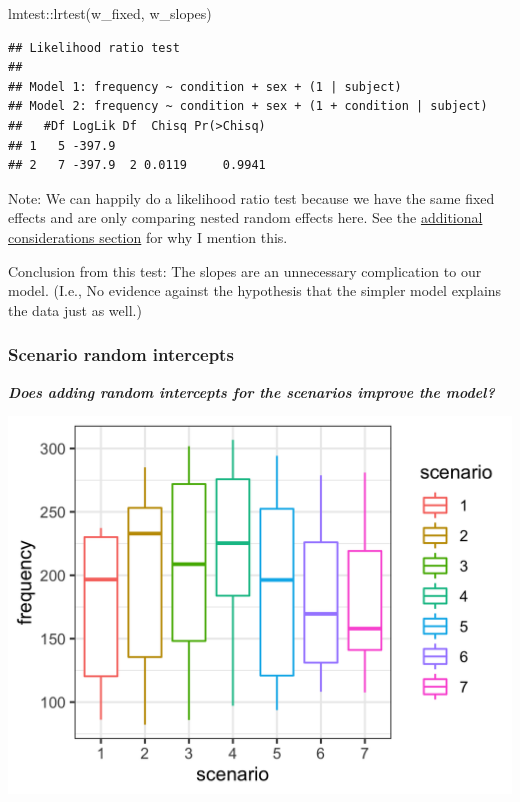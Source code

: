 \documentclass[
  openany]{book}
\newenvironment{Shaded}{\begin{snugshade}}{\end{snugshade}}
\newcommand{\FunctionTok}[1]{\textcolor[rgb]{0.00,0.00,0.00}{#1}}
\newcommand{\NormalTok}[1]{#1}
\newcommand{\SpecialCharTok}[1]{\textcolor[rgb]{0.00,0.00,0.00}{#1}}
\begin{document}
\begin{Shaded}
\begin{Highlighting}[]
\NormalTok{lmtest}\SpecialCharTok{::}\FunctionTok{lrtest}\NormalTok{(w\_fixed, w\_slopes)}
\end{Highlighting}
\end{Shaded}

\begin{verbatim}
## Likelihood ratio test
## 
## Model 1: frequency ~ condition + sex + (1 | subject)
## Model 2: frequency ~ condition + sex + (1 + condition | subject)
##   #Df LogLik Df  Chisq Pr(>Chisq)
## 1   5 -397.9                     
## 2   7 -397.9  2 0.0119     0.9941
\end{verbatim}

Note: We can happily do a likelihood ratio test because we have the same fixed effects and are only comparing nested random effects here. See the \protect\hyperlink{reml}{additional considerations section} for why I mention this.

Conclusion from this test: The slopes are an unnecessary complication to our model. (I.e., No evidence against the hypothesis that the simpler model explains the data just as well.)

\hypertarget{scenario-random-intercepts}{%
\subsubsection{Scenario random intercepts}\label{scenario-random-intercepts}}

\textbf{\emph{Does adding random intercepts for the scenarios improve the model?}}

\includegraphics[width=16.67in]{images/m3/scen_int}
\end{document}
